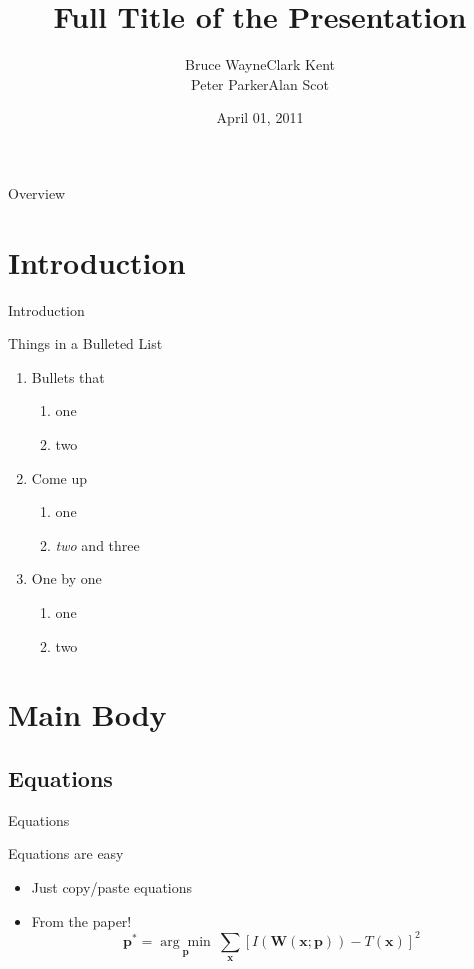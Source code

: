 \documentclass[pdflatex,compress,9pt,
	xcolor={dvipsnames,dvipsnames,svgnames,x11names,table},
	hyperref={colorlinks = true,breaklinks = true, urlcolor = NavyBlue, breaklinks = true}]{beamer}
\title
  [Short Title]
  {Full Title of the Presentation}
\author
  [Bruce Wayne]
  {Bruce Wayne\quad Clark Kent\\Peter Parker\quad Alan Scot}
\date
  {April 01, 2011}
\institute
  {Justice League of America}
\begin{document}
\maketitle

\begin{frame}{Overview}

  \tableofcontents

\end{frame}

\section
  {Introduction}

\begin{frame}
  {Introduction}

  Things in a Bulleted List\pause

  \begin{enumerate}
  \item Bullets that
    \begin{enumerate}
    \item one
    \item two
    \end{enumerate}\pause
  \item Come up
    \begin{enumerate}
    \item one
    \item \emph{two} and three
    \end{enumerate}\pause
  \item One by one
    \begin{enumerate}
    \item one
    \item two
    \end{enumerate}
  \end{enumerate}
\end{frame}


\section
  {Main Body}

\subsection{Equations}

\begin{frame}
  {Equations}

  Equations are easy
  \begin{itemize}
  \item Just copy/paste equations\pause
  \item From the paper!
    \begin{equation*}
      \textbf{p}^* = \underset{\textbf{p}}{\arg\!\min}~\sum_{\textbf{x}}\left[ I(\textbf{W}(\textbf{x};\textbf{p})) - T(\textbf{x}) \right]^2
    \end{equation*}
  \end{itemize}
\end{frame}
\end{document}
